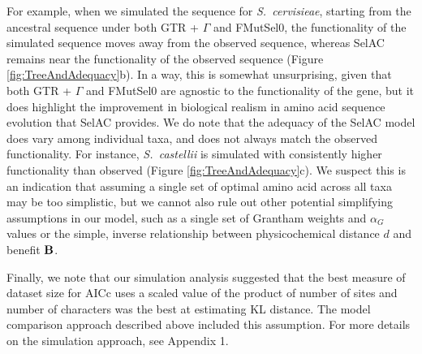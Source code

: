 \documentclass[12pt,letterpaper]{article}
\newcommand{\Func}{\ensuremath{\text{\textbf{B}}}\xspace}
\newcommand{\selac}{SelAC\xspace}
\newcommand{\alphag}{\ensuremath{\alpha_G}\xspace}
\begin{document}
For example, when we simulated the sequence for \emph{S.~cervisieae}, starting from the ancestral sequence under both GTR + $\Gamma$ and FMutSel0, the functionality of the simulated sequence moves away from the observed sequence, whereas SelAC remains near the functionality of the observed sequence (Figure \ref{fig:TreeAndAdequacy}b).
In a way, this is somewhat unsurprising, given that both GTR + $\Gamma$ and FMutSel0 are agnostic to the functionality of the gene, but it does highlight the improvement in biological realism in amino acid sequence evolution that \selac provides.
We do note that the adequacy of the \selac model does vary among individual taxa, and does not always match the observed functionality.
For instance, \emph{S.~castellii} is simulated with consistently higher functionality than observed (Figure \ref{fig:TreeAndAdequacy}c).
We suspect this is an indication that assuming a single set of optimal amino acid across all taxa may be too simplistic, but we cannot also rule out other potential simplifying assumptions in our model, such as a single set of Grantham weights and $\alphag$ values or the simple, inverse relationship between physicochemical distance $d$ and benefit \Func.

Finally, we note that our simulation analysis suggested that the best measure of dataset size for AICc uses a scaled value of the product of number of sites and number of characters was the best at estimating KL distance.
The model comparison approach described above included this assumption.
For more details on the simulation approach, see Appendix 1.
\end{document}
